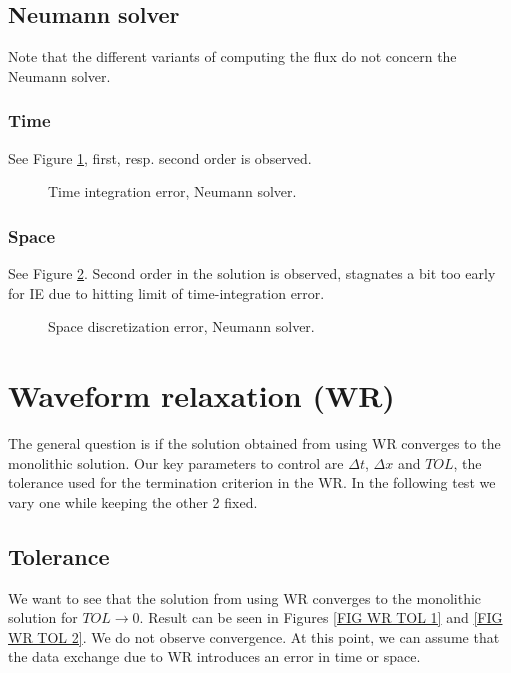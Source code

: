 \documentclass[a4paper,10pt]{article}
\begin{document}
\subsection{Neumann solver}
% 
Note that the different variants of computing the flux do not concern the Neumann solver.
% 
\FloatBarrier
\subsubsection{Time}
See Figure \ref{FIG N TIME}, first, resp. second order is observed.
% 
\begin{figure}[ht!]
\caption{Time integration error, Neumann solver.}
\label{FIG N TIME}
\end{figure}
% 
\FloatBarrier
\subsubsection{Space}
See Figure \ref{FIG N SPACE}. Second order in the solution is observed, stagnates a bit too early for IE due to hitting limit of time-integration error.

\begin{figure}[ht!]
\caption{Space discretization error, Neumann solver.}
\label{FIG N SPACE}
\end{figure}
% 
\FloatBarrier
\section{Waveform relaxation (WR)}
The general question is if the solution obtained from using WR converges to the monolithic solution. Our key parameters to control are $\Delta t$, $\Delta x$ and $TOL$, the tolerance used for the termination criterion in the WR. In the following test we vary one while keeping the other 2 fixed. 
% 
\FloatBarrier
\subsection{Tolerance}
We want to see that the solution from using WR converges to the monolithic solution for $TOL \rightarrow 0$. Result can be seen in Figures \ref{FIG WR TOL 1} and \ref{FIG WR TOL 2}. We do not observe convergence. At this point, we can assume that the data exchange due to WR introduces an error in time or space.
\end{document}
